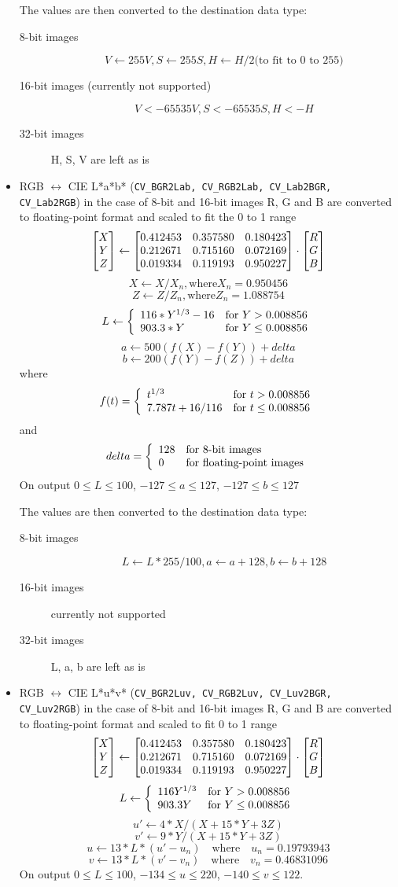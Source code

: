 \begin{itemize}
The values are then converted to the destination data type:
\begin{description}
\item[8-bit images]
\[ V \leftarrow 255 V, S \leftarrow 255 S, H \leftarrow H/2 \text{(to fit to 0 to 255)} \]
\item[16-bit images (currently not supported)]
\[ V <- 65535 V, S <- 65535 S, H <- H \]
\item[32-bit images]
H, S, V are left as is
\end{description}

 \item RGB $\leftrightarrow$ CIE L*a*b* (\texttt{CV\_BGR2Lab, CV\_RGB2Lab, CV\_Lab2BGR, CV\_Lab2RGB})
  in the case of 8-bit and 16-bit images
  R, G and B are converted to floating-point format and scaled to fit the 0 to 1 range
\[ \begin{bmatrix} X\\ Y\\ Z \end{bmatrix} \leftarrow \begin{bmatrix} 0.412453 & 0.357580 & 0.180423\\ 0.212671 & 0.715160 & 0.072169\\ 0.019334 & 0.119193 & 0.950227 \end{bmatrix}
\cdot
\begin{bmatrix} R\\ G\\ B \end{bmatrix} \]
\[ X \leftarrow X/X_n, \text{where} X_n = 0.950456 \]
\[ Z \leftarrow Z/Z_n, \text{where} Z_n = 1.088754 \]
\[ L \leftarrow \left\{ \begin{array}{l l} 116*Y^{1/3}-16 & \mbox{for $Y>0.008856$}\\ 903.3*Y & \mbox{for $Y \le 0.008856$}\\ \end{array} \right. \]
\[ a \leftarrow 500 (f(X)-f(Y)) + delta \]
\[ b \leftarrow 200 (f(Y)-f(Z)) + delta \]
where
\[f(t)=\left\{ \begin{array}{l l} t^{1/3} & \mbox{for $t>0.008856$}\\ 7.787 t+16/116 & \mbox{for $t\leq 0.008856$}\\ \end{array} \right. \]
and
\[ delta = \left\{ \begin{array}{l l} 128 & \mbox{for 8-bit images}\\ 0 & \mbox{for floating-point images}\\ \end{array} \right. \]
On output $0 \leq L \leq 100$, $-127 \leq a \leq 127$, $-127 \leq b \leq 127$

The values are then converted to the destination data type:
\begin{description}
\item[8-bit images]
\[L \leftarrow L*255/100, a \leftarrow a + 128, b \leftarrow b + 128\]
\item[16-bit images] currently not supported
\item[32-bit images]
L, a, b are left as is
\end{description}

 \item RGB $\leftrightarrow$ CIE L*u*v* (\texttt{CV\_BGR2Luv, CV\_RGB2Luv, CV\_Luv2BGR, CV\_Luv2RGB})
  in the case of 8-bit and 16-bit images
  R, G and B are converted to floating-point format and scaled to fit 0 to 1 range
  \[ \begin{bmatrix} X\\ Y\\ Z \end{bmatrix} \leftarrow \begin{bmatrix} 0.412453 & 0.357580 & 0.180423\\ 0.212671 & 0.715160 & 0.072169\\ 0.019334 & 0.119193 & 0.950227 \end{bmatrix}
\cdot
\begin{bmatrix} R\\ G\\ B \end{bmatrix} \]
\[ L \leftarrow \left\{ \begin{array}{l l} 116 Y^{1/3} & \mbox{for $Y>0.008856$}\\ 903.3 Y & \mbox{for $Y\leq 0.008856$}\\ \end{array} \right. \]
\[ u' \leftarrow 4*X/(X + 15*Y + 3 Z) \]
\[ v' \leftarrow 9*Y/(X + 15*Y + 3 Z) \]
\[ u \leftarrow 13*L*(u' - u_n) \quad \text{where} \quad u_n=0.19793943 \]
\[ v \leftarrow 13*L*(v' - v_n) \quad \text{where} \quad v_n=0.46831096 \]
On output $0 \leq L \leq 100$, $-134 \leq u \leq 220$, $-140 \leq v \leq 122$.


\end{itemize}
